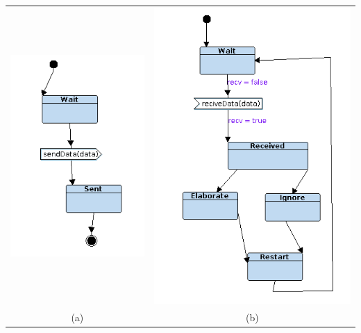 \documentclass[12pt]{article}
\begin{document}
\begin{table}[h!]
	\begin{center}
	\begin{tabular}{ c c }
	\includegraphics[scale=0.6]{images/conc_sensor.png}
	&
	\includegraphics[scale=0.6]{images/conc_main.png}
	\\
	(a)
	&
	(b)
	\end{tabular}
	\end{center}
	\label{fig:csm}
\end{table}\\\\
\end{document}
